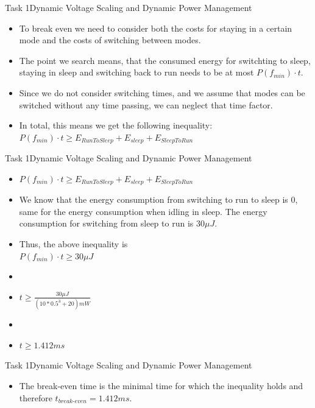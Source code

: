 \begin{frame}{Task 1}{Dynamic Voltage Scaling and Dynamic Power Management}
    \begin{solutionnoinc}
        \begin{itemize}
            \item To break even we need to consider both the costs for staying in a certain mode and the costs of switching between modes.
            \item The point we search means, that the consumed energy for switchting to sleep, staying in sleep and switching back to run needs to be at most $P(f_{min}) \cdot t$.
            \item Since we do not consider switching times, and we assume that modes can be switched without any time passing, we can neglect that time factor.
            \item In total, this means we get the following inequality: $P(f_{min}) \cdot t \geq E_{RunToSleep} + E_{sleep} + E_{SleepToRun}$
        \end{itemize}
    \end{solutionnoinc}
\end{frame}
\begin{frame}{Task 1}{Dynamic Voltage Scaling and Dynamic Power Management}
    \begin{solutionnoinc}
        \begin{itemize}
            \item $P(f_{min}) \cdot t \geq E_{RunToSleep} + E_{sleep} + E_{SleepToRun}$
            \item We know that the energy consumption from switching to run to sleep is 0, same for the energy consumption when idling in sleep. The energy consumption for switching from sleep to run is $30 \mu J$.
            \item Thus, the above inequality is\\ $P(f_{min}) \cdot t \geq 30 \mu J$
            \item[]
            \item[] $t \geq \frac{30 \mu J}{(10 * 0.5^3 + 20)mW}$
            \item[]
            \item[] $t \geq 1.412ms$
        \end{itemize}
    \end{solutionnoinc}
\end{frame}
\begin{frame}{Task 1}{Dynamic Voltage Scaling and Dynamic Power Management}
    \begin{solution}
        \begin{itemize}
            \item The break-even time is the minimal time for which the inequality holds and therefore $t_{break\text{-}even} = 1.412 ms.$
        \end{itemize}
    \end{solution}
\end{frame}

